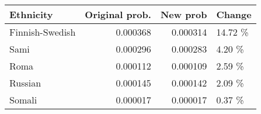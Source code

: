 \begin{tabular}{lrrl}
\toprule
      Ethnicity &  Original prob. &  New prob &  Change \\
\midrule
Finnish-Swedish &        0.000368 &  0.000314 & 14.72 \% \\
           Sami &        0.000296 &  0.000283 &  4.20 \% \\
           Roma &        0.000112 &  0.000109 &  2.59 \% \\
        Russian &        0.000145 &  0.000142 &  2.09 \% \\
         Somali &        0.000017 &  0.000017 &  0.37 \% \\
\bottomrule
\end{tabular}
